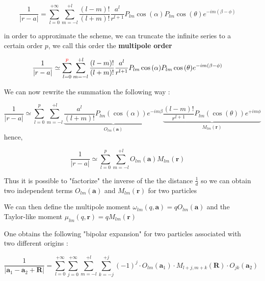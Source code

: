\documentclass[11pt,twoside,a4paper]{report}
\begin{document}
	\begin{equation}
	\frac{1}{|r - a|} = \sum\limits_{l=0}^{+\infty} \sum\limits_{m = -l}^{+l} \frac{(l-m)!}{(l+m)!} \frac{a^l}{r^{l+1}} P_{lm}\cos{(\alpha)}P_{lm}\cos{(\theta)}e^{-im(\beta - \phi)}
	\end{equation}
	
	in order to approximate the scheme, we can truncate the infinite series to a certain order $p$, we call this order the \textbf{multipole order}
	
	\begin{equation}	
	\frac{1}{|r - a|} \simeq \sum\limits_{l=0}^{\textcolor{red}{p}} \sum\limits_{m = -l}^{+l} \frac{(l-m)!}{(l+m)!} \frac{a^l}{r^{l+1}} P_{lm}\cos{(\alpha)}P_{lm}\cos{(\theta)}e^{-im(\beta - \phi)}
	\label{eq:order}
	\end{equation}
	
	We can now rewrite the summation the following way :
	
		\begin{equation}
	\frac{1}{|r - a|} \simeq \sum\limits_{l=0}^{p} \sum\limits_{m = -l}^{+l}
	\underbrace{\frac{a^l}{(l+m)!} P_{lm}(\cos(\alpha))e^{-im\beta}} _{O_{lm}(\textbf{a})}
    \underbrace{\frac{(l-m)!}{r^{l+1}} P_{lm}(\cos(\theta))e^{+im\phi}} _{M_{lm}(\textbf{r})}
	\end{equation}
	hence,
	
		\begin{equation}
	\frac{1}{|r - a|} \simeq \sum\limits_{l=0}^{p} \sum\limits_{m = -l}^{+l}
	{O_{lm}(\textbf{a})}
    {M_{lm}(\textbf{r})}
	\end{equation}
	
	
	Thus it is possible to "factorize" the inverse of the the distance $\frac{1}{d}$ so we can obtain two independent terms ${O_{lm}(\textbf{a})}$ and ${M_{lm}(\textbf{r})}$  for two particles 


	We can then define the multipole moment $\omega_{lm}(q,\textbf{a}) = q O_{lm}(\textbf{a})$ and the Taylor-like moment $\mu_{lm}(q,\textbf{r}) = q M_{lm}(\textbf{r})$
	
	One obtains the following "bipolar expansion" for two particles associated with two different origins :
	
    \begin{equation}
    \frac{1}{|\textbf{a}_1 - \textbf{a}_2 + \textbf{R}|} = 
    \sum\limits_{l=0}^{+\infty}
    \sum\limits_{j=0}^{+\infty}
    \sum\limits_{m=-l}^{+l}
    \sum\limits_{k=-j}^{+j}
    (-1)^j \cdot O_{lm}(\textbf{a}_1) \cdot M_{l+j,m+k}(\textbf{R}) \cdot O_{jk}(\textbf{a}_2)
    \end{equation}
\end{document}
